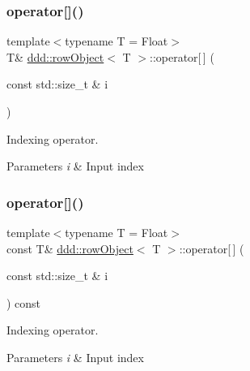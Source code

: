 \subsubsection{\texorpdfstring{operator[]()}{operator[]()}\hspace{0.1cm}{\footnotesize\ttfamily [1/2]}}
{\footnotesize\ttfamily template$<$typename T  = Float$>$ \\
T\& \hyperlink{classddd_1_1row_object}{ddd\+::row\+Object}$<$ T $>$\+::operator\mbox{[}$\,$\mbox{]} (\begin{DoxyParamCaption}\item[{const std\+::size\+\_\+t \&}]{i }\end{DoxyParamCaption})\hspace{0.3cm}{\ttfamily [inline]}}



Indexing operator. 


\begin{DoxyParams}{Parameters}
{\em i} & Input index \\
\hline
\end{DoxyParams}
\mbox{\label{classddd_1_1row_object_a60418f8af09e6913d16b48f2cb53e826}} 
\subsubsection{\texorpdfstring{operator[]()}{operator[]()}\hspace{0.1cm}{\footnotesize\ttfamily [2/2]}}
{\footnotesize\ttfamily template$<$typename T  = Float$>$ \\
const T\& \hyperlink{classddd_1_1row_object}{ddd\+::row\+Object}$<$ T $>$\+::operator\mbox{[}$\,$\mbox{]} (\begin{DoxyParamCaption}\item[{const std\+::size\+\_\+t \&}]{i }\end{DoxyParamCaption}) const\hspace{0.3cm}{\ttfamily [inline]}}



Indexing operator. 


\begin{DoxyParams}{Parameters}
{\em i} & Input index \\
\hline
\end{DoxyParams}
\mbox{\label{classddd_1_1row_object_a6c87f5fadb3b725f6c52cb08aed98eb2}} 
